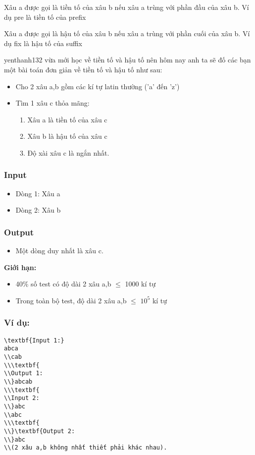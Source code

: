 



   Xâu a được gọi là   tiền tố   của xâu b nếu xâu a trùng với phần đầu của xâu b. Ví dụ       pre      là tiền tố của       prefix   

   Xâu a được gọi là   hậu tố   của xâu b nếu xâu a trùng với phần cuối của xâu b. Ví dụ       fix      là hậu tố của       suffix   

yenthanh132   vừa mới học về tiền tố và hậu tố nên hôm nay anh ta sẽ đố các bạn một bài toán đơn giản về tiền tố và hậu tố như sau:  
\begin{itemize}
	\item     Cho 2 xâu a,b gồm các kí tự latin thường ('a' đến 'z')   
	\item     Tìm 1 xâu c thỏa mãng:    
\begin{enumerate}
	\item       Xâu a là tiền tố của xâu c     
	\item       Xâu b là hậu tố của xâu c     
	\item       Độ xài xâu c là ngắn nhất.     
\end{enumerate}
\end{itemize}
\begin{enumerate}
\end{enumerate}

\subsubsection{   Input  }
\begin{itemize}
	\item     Dòng 1: Xâu a   
	\item     Dòng 2: Xâu b   
\end{itemize}

\subsubsection{   Output  }
\begin{itemize}
	\item     Một dòng duy nhất là xâu c.   
\end{itemize}

\textbf{     Giới hạn:    }
\begin{itemize}
	\item     40\% số test có độ dài 2 xâu a,b  $\le$  1000 kí tự   
	\item     Trong toàn bộ test, độ dài 2 xâu a,b  $\le$  $10^{5}$    kí tự   
\end{itemize}

\subsubsection{\textbf{    Ví dụ:   }}
\begin{verbatim}
\textbf{Input 1:}
abca
\\cab
\\\textbf{
\\Output 1:
\\}abcab
\\\textbf{
\\Input 2:
\\}abc
\\abc
\\\textbf{
\\}\textbf{Output 2:
\\}abc
\\(2 xâu a,b không nhất thiết phải khác nhau).\end{verbatim}
